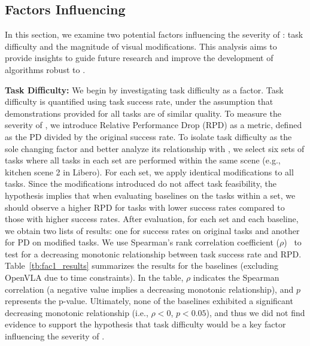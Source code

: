


\subsection{Factors Influencing \pb}
\label{subsec:factors}




In this section, we examine two potential factors influencing the severity of \pb: task difficulty and the magnitude of visual modifications. This analysis aims to provide insights to guide future research and improve the development of algorithms robust to \pb. %

\textbf{Task Difficulty:} We begin by investigating task difficulty as a factor. Task difficulty is quantified using task success rate, under the assumption that demonstrations provided for all tasks are of similar quality. To measure the severity of \pb, we introduce Relative Performance Drop (RPD) as a metric, defined as the PD divided by the original success rate. To isolate task difficulty as the sole changing factor and better analyze its relationship with \pb, we select six sets of tasks where all tasks in each set are performed within the same scene (e.g., kitchen scene 2 in Libero). For each set, we apply identical modifications to all tasks. Since the modifications introduced do not affect task feasibility, the hypothesis implies that when evaluating baselines on the tasks within a set, we should observe a higher RPD for tasks with lower success rates compared to those with higher success rates. After evaluation, for each set and each baseline, we obtain two lists of results: one for success rates on original tasks and another for PD on modified tasks. We use Spearman's rank correlation coefficient ($\rho$)~\cite{spearman1961proof} to test for a decreasing monotonic relationship between task success rate and RPD. Table~\ref{tb:fac1_results} summarizes the results for the baselines (excluding OpenVLA due to time constraints). In the table, $\rho$ indicates the Spearman correlation (a negative value implies a decreasing monotonic relationship), and $p$ represents the p-value. Ultimately, none of the baselines exhibited a significant decreasing monotonic relationship (i.e., $\rho < 0$, $p < 0.05$), and  thus we did not find evidence to support the hypothesis that task difficulty would be a key factor influencing the severity of \pb. 

